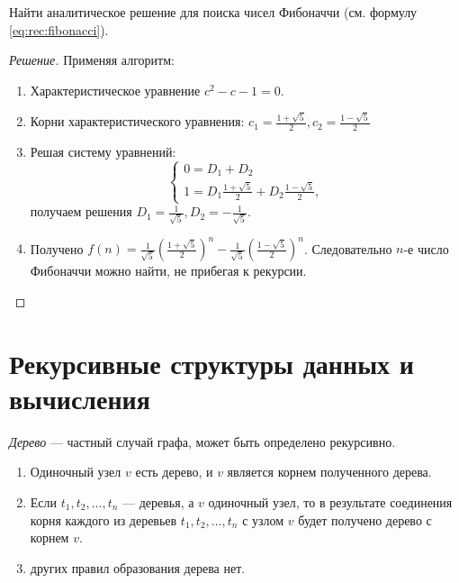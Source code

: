 \begin{exampl}
    Найти аналитическое решение для поиска чисел Фибоначчи (см. формулу \eqref{eq:rec:fibonacci}).
\end{exampl}
\begin{proof}[Решение] 
    Применяя алгоритм:
    
    \begin{enumerate}
        \item Характеристическое уравнение $c^2-c-1=0$.
        \item Корни характеристического уравнения: $c_1=\frac{1+\sqrt{5}}{2},c_2=\frac{1-\sqrt{5}}{2}$
        \item Решая систему уравнений:
        \[
            \begin{cases}
                0=D_1 + D_2\\
                1=D_1\frac{1+\sqrt{5}}{2} + D_2\frac{1-\sqrt{5}}{2},
            \end{cases}
        \]
        получаем решения $D_1=\frac{1}{\sqrt{5}}, D_2=-\frac{1}{\sqrt{5}}$.
        \item Получено $f(n)=\frac{1}{\sqrt{5}}(\frac{1+\sqrt{5}}{2})^n-\frac{1}{\sqrt{5}}(\frac{1-\sqrt{5}}{2})^n$. Следовательно $n$-е число Фибоначчи можно найти, не прибегая к рекурсии.
    \end{enumerate}
\end{proof}


\section{Рекурсивные структуры данных и вычисления}

\emph{Дерево} --- частный случай графа, может быть определено рекурсивно.
\begin{enumerate}
    \item Одиночный узел $v$ есть дерево, и $v$ является корнем полученного дерева.
    \item Если $t_1,t_2,\ldots,t_n$ --- деревья, а $v$ одиночный узел, то в результате соединения корня каждого из деревьев $t_1,t_2,\ldots,t_n$ с узлом $v$ будет получено дерево с корнем $v$.
    \item других правил образования дерева нет.
\end{enumerate}


